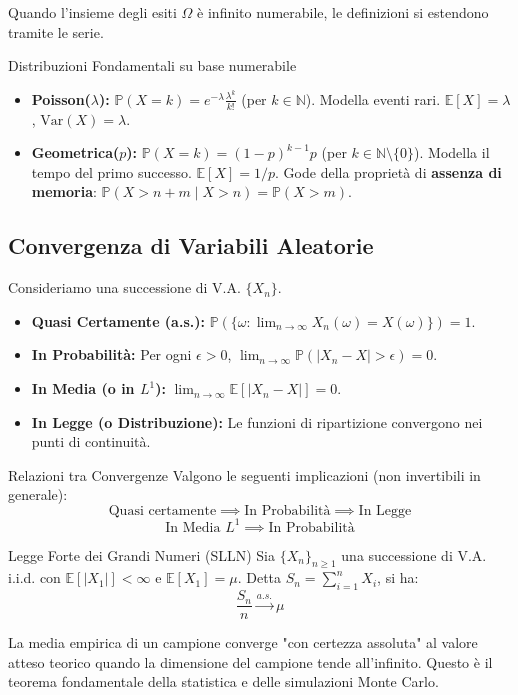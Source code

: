 \documentclass[11pt,a4paper]{article}
\begin{document}
Quando l'insieme degli esiti $\Omega$ è infinito numerabile, le definizioni si estendono tramite le serie. 

\begin{definizione}{Distribuzioni Fondamentali su base numerabile}{}
\begin{itemize}
    \item \textbf{Poisson($\lambda$):} $\mathbb{P}(X=k) = e^{-\lambda} \frac{\lambda^k}{k!}$ (per $k \in \mathbb{N}$). Modella eventi rari. $\mathbb{E}[X] = \lambda$, $\text{Var}(X) = \lambda$.
    \item \textbf{Geometrica($p$):} $\mathbb{P}(X=k) = (1-p)^{k-1} p$ (per $k \in \mathbb{N}\setminus\{0\}$). Modella il tempo del primo successo. $\mathbb{E}[X] = 1/p$. Gode della proprietà di \textbf{assenza di memoria}: $\mathbb{P}(X > n+m \mid X > n) = \mathbb{P}(X > m)$.
\end{itemize}
\end{definizione}

\subsection{Convergenza di Variabili Aleatorie}
Consideriamo una successione di V.A. $\{X_n\}$.
\begin{itemize}
    \item \textbf{Quasi Certamente (a.s.):} $\mathbb{P}(\{\omega : \lim_{n \to \infty} X_n(\omega) = X(\omega)\}) = 1$.
    \item \textbf{In Probabilità:} Per ogni $\epsilon > 0$, $\lim_{n \to \infty} \mathbb{P}(|X_n - X| > \epsilon) = 0$.
    \item \textbf{In Media (o in $L^1$):} $\lim_{n \to \infty} \mathbb{E}[|X_n - X|] = 0$.
    \item \textbf{In Legge (o Distribuzione):} Le funzioni di ripartizione convergono nei punti di continuità.
\end{itemize}

\begin{teorema}{Relazioni tra Convergenze}{}
Valgono le seguenti implicazioni (non invertibili in generale):
\[ \text{Quasi certamente} \implies \text{In Probabilità} \implies \text{In Legge} \]
\[ \text{In Media } L^1 \implies \text{In Probabilità} \]
\end{teorema}

\begin{teorema}{Legge Forte dei Grandi Numeri (SLLN)}{}
Sia $\{X_n\}_{n \ge 1}$ una successione di V.A. i.i.d. con $\mathbb{E}[|X_1|] < \infty$ e $\mathbb{E}[X_1] = \mu$. Detta $S_n = \sum_{i=1}^n X_i$, si ha:
\[ \frac{S_n}{n} \xrightarrow{a.s.} \mu \]
\end{teorema}
\begin{intuizione}
La media empirica di un campione converge "con certezza assoluta" al valore atteso teorico quando la dimensione del campione tende all'infinito. Questo è il teorema fondamentale della statistica e delle simulazioni Monte Carlo.
\end{intuizione}
\end{document}
